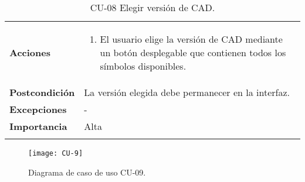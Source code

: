 \begin{longtable}[H]{@{}ll@{}}
\begin{minipage}[t]{0.23\columnwidth}
\textbf{Acciones}\strut
\end{minipage} & \begin{minipage}[t]{0.71\columnwidth}\raggedright\strut
\begin{enumerate}
\def\labelenumi{\arabic{enumi}.}
\tightlist
\item
 El usuario elige la versión de CAD mediante un botón desplegable que contienen todos los símbolos disponibles.
\end{enumerate}\strut
\end{minipage}\tabularnewline
\begin{minipage}[t]{0.23\columnwidth}\raggedright\strut
\textbf{Postcondición}\strut
\end{minipage} & \begin{minipage}[t]{0.71\columnwidth}\raggedright\strut
  La versión elegida debe permanecer en la interfaz.
\end{minipage}\tabularnewline
\begin{minipage}[t]{0.23\columnwidth}\raggedright\strut
\textbf{Excepciones}\strut
\end{minipage} & \begin{minipage}[t]{0.71\columnwidth}\raggedright\strut
-\strut
\end{minipage}\tabularnewline
\begin{minipage}[t]{0.23\columnwidth}\raggedright\strut
\textbf{Importancia}\strut
\end{minipage} & \begin{minipage}[t]{0.71\columnwidth}\raggedright\strut
Alta\strut
\end{minipage}\tabularnewline
\bottomrule
\caption{CU-08 Elegir versión de CAD.}
\end{longtable}


\begin{figure}[H]
	\centering
	\texttt{[image: CU-9]}
	\caption{Diagrama de caso de uso CU-09.}
	\label{fig:CU-9}
\end{figure}


